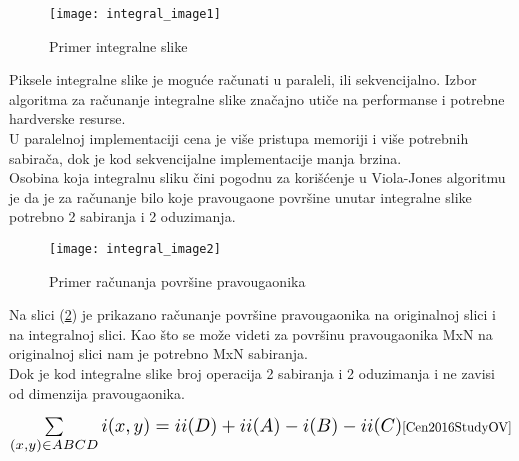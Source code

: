 \begin{figure}[h]
  \centering
  \texttt{[image: integral\_image1]}
  \caption{Primer integralne slike}
  \label{IntegralImage_img1}
\end{figure}

Piksele integralne slike je moguće računati u paraleli, ili
sekvencijalno. Izbor algoritma za računanje integralne slike značajno utiče na
performanse i potrebne hardverske resurse. \\
U paralelnoj implementaciji cena je
više pristupa memoriji i više potrebnih sabirača, dok je kod sekvencijalne
implementacije manja brzina. \\

Osobina koja integralnu sliku čini pogodnu za korišćenje u Viola-Jones algoritmu
je da je za računanje bilo koje pravougaone površine unutar integralne slike
potrebno 2 sabiranja i 2 oduzimanja.

\begin{figure}[h]
  \centering
  \texttt{[image: integral\_image2]}
  \caption{Primer računanja površine pravougaonika \cite{IntegralImage1_web}}
  \label{IntegralImage_img2}
\end{figure}

Na slici (\ref{IntegralImage_img2}) je prikazano računanje površine pravougaonika na
originalnoj slici i na integralnoj slici.
Kao što se može videti za površinu pravougaonika MxN na originalnoj slici nam je
potrebno MxN sabiranja. \\
Dok je kod integralne slike broj operacija 2 sabiranja i 2
oduzimanja i ne zavisi od dimenzija pravougaonika.

\begin{equation}
  \Scale[1.4]{\sum\limits_{(x,y)\in ABCD} i(x,y)=ii(D)+ii(A)-i(B)-ii(C)}
  \cite{Cen2016StudyOV}
  \label{IntegralImage_eq2}
\end{equation}